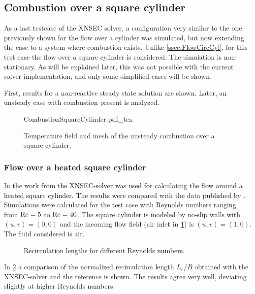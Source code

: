 \FloatBarrier
\subsection{Combustion over a square cylinder}
As a last testcase of the XNSEC solver, a configuration very similar to the one previously shown for the flow over a cylinder was simulated, but now extending the case to a system where combustion exists. 
Unlike \cref{ssec:FlowCircCyl}, for this test case the flow over a square cylinder is considered.  The simulation is non-stationary. As will be explained later, this was not possible with the current solver implementation, and only some simplified cases will be shown. 


First, results for a non-reactive steady state solution are shown. Later, an unsteady case with combustion present is analyzed.
\begin{figure}[h]
	\begin{center}
		\def\svgwidth{0.8\textwidth}
		{CombustionSquareCylinder.pdf_tex}
		\caption{Temperature field and mesh of the unsteady combustion over a square cylinder.}
		\label{fig:CombustionSquareCylinder}
	\end{center}
\end{figure}


\subsubsection{Flow over a heated square cylinder}
In the work from \textcite{miaoHighOrderSimulationLowMachFlows2022} the XNSEC-solver was used for calculating the flow around a heated square cylinder. The results were compared with the data published by \textcite{sharmaHEATFLUIDFLOW2004}. Simulations were calculated for the test case with Reynolds numbers ranging from $\text{Re} = 5$ to $\text{Re} = 40$. The square cylinder is modeled by no-slip walls with $(u,v) = (0,0)$ and the incoming flow field (air inlet in \cref{fig:CombustionSquareCylinder}) is $(u,v) = (1,0)$. The fluid considered is air. 
\begin{figure}[h!]
	\centering
	\caption{Recirculation lengths for different Reynolds numbers.}
	\label{fig:RecirculationLength}
\end{figure}
In \cref{fig:RecirculationLength} a comparison of the normalized recirculation length $L_r/B$ obtained with the XNSEC-solver and the reference is shown. The results agree very well, deviating slightly at higher Reynolds numbers.

